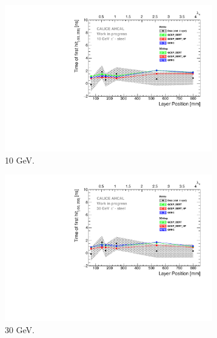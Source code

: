 \begin{figure}[htbp!]
	\begin{subfigure}[t]{0.5\textwidth}
		\centering
		\includegraphics[width=1\textwidth]{../Thesis_Plots/Timing/Pions/Plots/ComparisonToSim/Time_Depth_10GeV.pdf}
		\caption{10 GeV.}\label{fig:Depth_SimData_10GeV}
	\end{subfigure}
	\hfill
	\begin{subfigure}[t]{0.5\textwidth}
		\centering
		\includegraphics[width=1\textwidth]{../Thesis_Plots/Timing/Pions/Plots/ComparisonToSim/Time_Depth_30GeV.pdf}
		\caption{30 GeV.} \label{fig:Depth_SimData_30GeV}
	\end{subfigure}
	\hfill
	\begin{subfigure}[t]{0.5\textwidth}
		\centering

\end{subfigure}
\end{figure}
